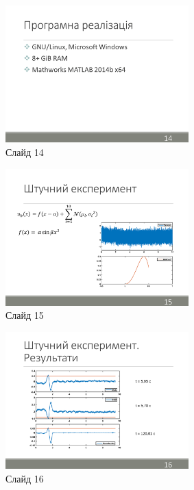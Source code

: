 \documentclass[pdftex]{thesis_utf8}
\begin{document}
\begin{figure}[h]
    \centering
    \includegraphics[width=0.63\textwidth]{slides/slide14.png}
    \caption{Слайд 14}
\end{figure}
\clearpage

\begin{figure}[h]
    \centering
    \includegraphics[width=0.63\textwidth]{slides/slide15.png}
    \caption{Слайд 15}
\end{figure}

\begin{figure}[h]
    \centering
    \includegraphics[width=0.63\textwidth]{slides/slide16.png}
    \caption{Слайд 16}
\end{figure}
\clearpage
\end{document}
